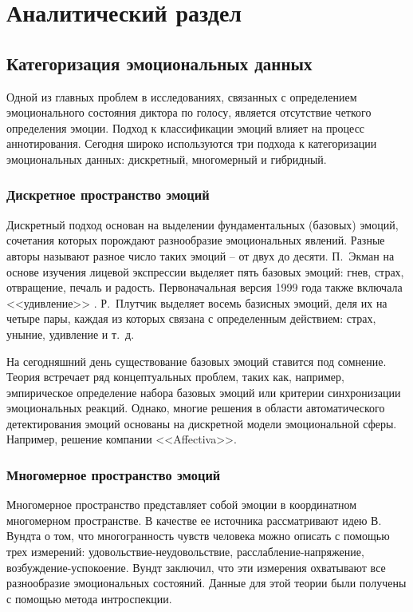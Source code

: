 \chapter{Аналитический раздел}
\section{Категоризация эмоциональных данных}
Одной из главных проблем в исследованиях, связанных с определением эмоционального состояния диктора по голосу, является отсутствие четкого определения эмоции. Подход к классификации эмоций влияет на процесс аннотирования. Сегодня широко используются три подхода к категоризации эмоциональных данных: дискретный, многомерный и гибридный.
\subsection{Дискретное пространство эмоций}
Дискретный подход основан на выделении фундаментальных (базовых) эмоций, сочетания которых порождают разнообразие эмоциональных явлений. Разные авторы называют разное число таких эмоций -- от двух до десяти. П.~Экман на основе изучения лицевой экспрессии выделяет пять базовых эмоций: гнев, страх, отвращение, печаль и радость. Первоначальная версия 1999 года также включала <<удивление>> \cite{Ekman1972, Ekman1992}. Р.~Плутчик \cite{Plutchik1980} выделяет восемь базисных эмоций, деля их на четыре пары, каждая из которых связана с определенным действием: страх, уныние, удивление и т.~д. 

На сегодняшний день существование базовых эмоций ставится под сомнение. Теория встречает ряд концептуальных проблем, таких как, например, эмпирическое определение набора базовых эмоций или критерии синхронизации эмоциональных реакций. Однако, многие решения в области автоматического детектирования эмоций основаны на дискретной модели эмоциональной сферы. Например, решение компании <<Affectiva>>.~\cite{Affectica}

\subsection{Многомерное пространство эмоций}
Многомерное пространство представляет собой эмоции в координатном многомерном пространстве. В качестве ее источника рассматривают идею В. Вундта о том, что многогранность чувств
человека можно описать с помощью трех измерений: удовольствие-неудовольствие, расслабление-напряжение, возбуждение-успокоение. Вундт заключил, \cite{Вундт1984} что эти измерения охватывают все разнообразие эмоциональных состояний. Данные для этой теории были получены с помощью метода интроспекции.

